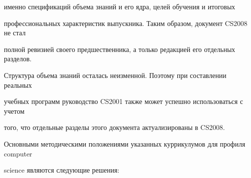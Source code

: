 именно спецификаций объема знаний и его ядра, целей обучения и итоговых 

профессиональных характеристик выпускника. Таким образом, документ CS2008 не стал 

полной ревизией своего предшественника, а только редакцией его отдельных разделов. 

Структура объема знаний осталась неизменной. Поэтому при составлении реальных 

учебных программ руководство CS2001 также может успешно использоваться с учетом 

того, что отдельные разделы этого документа актуализированы в CS2008.



Основными методическими положениями указанных куррикулумов для профиля computer 

science являются следующие решения:

